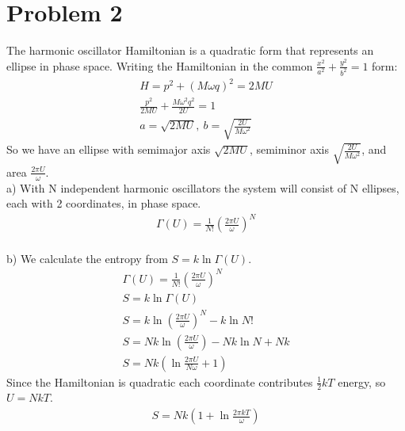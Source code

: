 \documentclass[a4paper,10pt]{article}
\numberwithin{equation}{section}
\begin{document}
\section{Problem 2}
The harmonic oscillator Hamiltonian is a quadratic form that represents an ellipse in phase space.
Writing the Hamiltonian in the common $\frac{x^2}{a^2}+\frac{y^2}{b^2}=1$ form:
\begin{gather}
 H=p^2+(M\omega q)^2=2MU\\
 \frac{p^2}{2MU}+\frac{M\omega^2q^2}{2U}=1\\
 a=\sqrt{2MU},\ b=\sqrt{\frac{2U}{M\omega^2}}
\end{gather}
So we have an ellipse with semimajor axis $\sqrt{2MU}$, semiminor axis $\sqrt{\frac{2U}{M\omega^2}}$, and area $\frac{2\pi U}{\omega}$.
\\
a) With N independent harmonic oscillators the system will consist of N ellipses, each with 2 coordinates, in phase space. 
\begin{gather}
 \Gamma (U) = \frac{1}{N!}\left(\frac{2\pi U}{\omega}\right)^N
\end{gather}
\\
b) We calculate the entropy from $S=k\ln{\Gamma (U)}$.
\begin{gather}
 \Gamma (U) = \frac{1}{N!}\left(\frac{2\pi U}{\omega}\right)^N\\
 S=k\ln{\Gamma (U)}\\
 S=k\ln{\left(\frac{2\pi U}{\omega}\right)^N}-k\ln{N!}\\
 S=Nk\ln{\left(\frac{2\pi U}{\omega}\right)}-Nk\ln{N}+Nk\\
 S=Nk\left(\ln{\frac{2\pi U}{N \omega}}+1\right)
\end{gather}
Since the Hamiltonian is quadratic each coordinate contributes $\frac{1}{2}kT$ energy, so $U=NkT$.
\begin{gather}
 S=Nk\left(1+\ln{\frac{2\pi kT}{\omega}}\right)
\end{gather}
\end{document}
